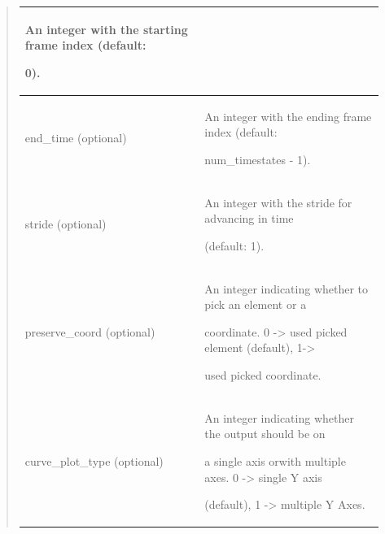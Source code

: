 \documentclass[letterpaper,10pt,english]{sphinxmanual}
\begin{document}
\begin{quote}
\begin{tabular}{|p{0.475\linewidth}|p{0.475\linewidth}|}
\begin{DUlineblock}{0em}
\item[] An integer with the starting frame index (default:
\item[] 0).
\end{DUlineblock}
\\
\hline
end\_time (optional)
 & 
\begin{DUlineblock}{0em}
\item[] An integer with the ending frame index (default:
\item[] num\_timestates - 1).
\end{DUlineblock}
\\
\hline
stride (optional)
 & 
\begin{DUlineblock}{0em}
\item[] An integer with the stride for advancing in time
\item[] (default: 1).
\end{DUlineblock}
\\
\hline
preserve\_coord (optional)
 & 
\begin{DUlineblock}{0em}
\item[] An integer indicating whether to pick an element or a
\item[] coordinate. 0 -\textgreater{} used picked element (default), 1-\textgreater{}
\item[] used picked coordinate.
\end{DUlineblock}
\\
\hline
curve\_plot\_type (optional)
 & 
\begin{DUlineblock}{0em}
\item[] An integer indicating whether the output should be on
\item[] a single axis orwith multiple axes. 0 -\textgreater{} single Y axis
\item[] (default), 1 -\textgreater{} multiple Y Axes.
\end{DUlineblock}
\\
\hline\end{tabular}

\end{quote}
\end{document}
